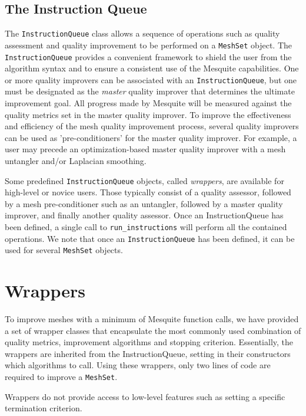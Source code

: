 \subsection{The Instruction Queue} \label{sec:IQ}

The \texttt{InstructionQueue} class allows a sequence of operations
such as quality assessment and quality improvement to be performed on
a \texttt{MeshSet} object. The \texttt{InstructionQueue} 
provides a convenient framework to shield the user
from the algorithm syntax and to ensure a consistent use of the
Mesquite capabilities.  One or more quality improvers can be
associated with an {\tt InstructionQueue}, but one must be designated
as the {\it master} quality improver that determines the ultimate 
improvement goal.  All progress made by Mesquite will be
measured against the quality metrics set in the master quality
improver.  To improve the effectiveness and efficiency of the mesh
quality improvement process, several quality improvers can be used as
'pre-conditioners' for the master quality improver.  For example, a
user may precede an optimization-based master quality improver with a
mesh untangler and/or Laplacian smoothing.

Some predefined \texttt{InstructionQueue} objects, called \emph
{wrappers}, are available for high-level or novice users. Those
typically consist of a quality assessor, followed by a mesh
pre-conditioner such as an untangler, followed by a master quality
improver, and finally another quality assessor.  Once an
InstructionQueue has been defined, a single call to \texttt{run\_instructions} 
will perform all the contained operations.  We note
that once an \texttt{InstructionQueue} has been defined, it can be used
for several \texttt{MeshSet} objects.


\section{Wrappers}
\label{sec:wrappers}
To improve meshes with a minimum of Mesquite function calls, we have 
provided a set of wrapper classes that encapsulate the 
most commonly used combination of quality metrics, improvement
algorithms and stopping criterion. Essentially, the wrappers are
inherited from the InstructionQueue, setting in their constructors
which algorithms to call. Using these wrappers, only
two lines of code are required to improve a \texttt{MeshSet}.

Wrappers do not provide access to low-level 
features such as setting a specific
termination criterion.  

